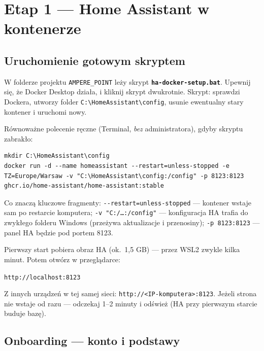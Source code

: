 \documentclass[11pt,a4paper]{article}
\begin{document}
\section{Etap 1 --- Home Assistant w kontenerze}
\label{sec:etap1}

\subsection{Uruchomienie gotowym skryptem}

W folderze projektu \texttt{AMPERE\_POINT} leży skrypt \textbf{\texttt{ha-docker-setup.bat}}. Upewnij się, że Docker Desktop działa, i kliknij skrypt dwukrotnie. Skrypt: sprawdzi Dockera, utworzy folder \texttt{C:\textbackslash HomeAssistant\textbackslash config}, usunie ewentualny stary kontener i uruchomi nowy.

Równoważne polecenie ręczne (Terminal, \emph{bez} administratora), gdyby skryptu zabrakło:

\begin{lstlisting}
mkdir C:\HomeAssistant\config
docker run -d --name homeassistant --restart=unless-stopped -e TZ=Europe/Warsaw -v "C:\HomeAssistant\config:/config" -p 8123:8123 ghcr.io/home-assistant/home-assistant:stable
\end{lstlisting}

Co znaczą kluczowe fragmenty: \texttt{-{}-restart=unless-stopped} --- kontener wstaje sam po restarcie komputera; \texttt{-v "C:/\ldots:/config"} --- konfiguracja HA trafia do zwykłego folderu Windows (przeżywa aktualizacje i przenosiny); \texttt{-p 8123:8123} --- panel HA będzie pod portem 8123.

Pierwszy start pobiera obraz HA (ok.~1,5 GB) --- przez WSL2 zwykle kilka minut. Potem otwórz w przeglądarce:

\begin{center}\Large\texttt{http://localhost:8123}\end{center}

Z innych urządzeń w tej samej sieci: \texttt{http://<IP-komputera>:8123}. Jeżeli strona nie wstaje od razu --- odczekaj 1--2 minuty i odśwież (HA przy pierwszym starcie buduje bazę).

\subsection{Onboarding --- konto i podstawy}
\end{document}
